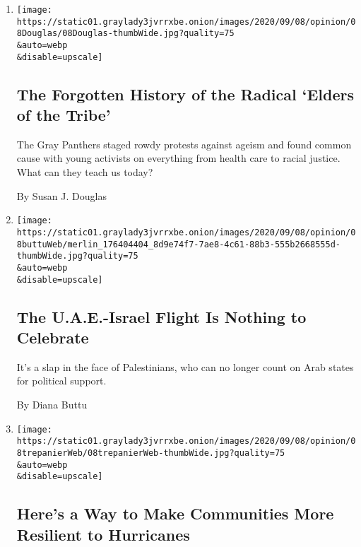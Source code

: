 \begin{enumerate}
\def\labelenumi{\arabic{enumi}.}
\item
  \href{/2020/09/08/opinion/gray-panthers-maggie-kuhn.html}{}

  \texttt{[image: https://static01.graylady3jvrrxbe.onion/images/2020/09/08/opinion/08Douglas/08Douglas-thumbWide.jpg?quality=75\\\&auto=webp\\\&disable=upscale]}

  \hypertarget{the-forgotten-history-of-the-radical-elders-of-the-tribe}{%
  \subsection{The Forgotten History of the Radical `Elders of the
  Tribe'}\label{the-forgotten-history-of-the-radical-elders-of-the-tribe}}

  The Gray Panthers staged rowdy protests against ageism and found
  common cause with young activists on everything from health care to
  racial justice. What can they teach us today?

  By Susan J. Douglas
\item
  \href{/2020/09/08/opinion/uae-israel-palestinians.html}{}

  \texttt{[image: https://static01.graylady3jvrrxbe.onion/images/2020/09/08/opinion/08buttuWeb/merlin\_176404404\_8d9e74f7-7ae8-4c61-88b3-555b2668555d-thumbWide.jpg?quality=75\\\&auto=webp\\\&disable=upscale]}

  \hypertarget{the-uae-israel-flight-is-nothing-to-celebrate}{%
  \subsection{The U.A.E.-Israel Flight Is Nothing to
  Celebrate}\label{the-uae-israel-flight-is-nothing-to-celebrate}}

  It's a slap in the face of Palestinians, who can no longer count on
  Arab states for political support.

  By Diana Buttu
\item
  \href{/2020/09/08/opinion/hurricanes-scientists-damage.html}{}

  \texttt{[image: https://static01.graylady3jvrrxbe.onion/images/2020/09/08/opinion/08trepanierWeb/08trepanierWeb-thumbWide.jpg?quality=75\\\&auto=webp\\\&disable=upscale]}

  \hypertarget{heres-a-way-to-make-communities-more-resilient-to-hurricanes}{%
  \subsection{Here's a Way to Make Communities More Resilient to
  Hurricanes}\label{heres-a-way-to-make-communities-more-resilient-to-hurricanes}}


\end{enumerate}
